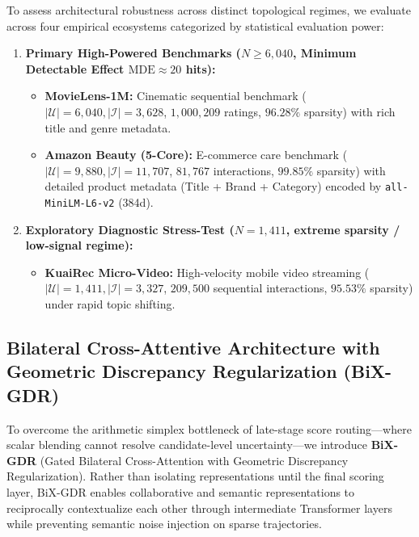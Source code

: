 To assess architectural robustness across distinct topological regimes, we evaluate across four empirical ecosystems categorized by statistical evaluation power:
\begin{enumerate}[leftmargin=*]
    \item \textbf{Primary High-Powered Benchmarks ($N \ge 6{,}040$, Minimum Detectable Effect $\text{MDE} \approx 20$ hits):}
    \begin{itemize}
        \item \textbf{MovieLens-1M:} Cinematic sequential benchmark ($|\mathcal{U}| = 6{,}040, |\mathcal{I}| = 3{,}628$, $1{,}000{,}209$ ratings, $96.28\%$ sparsity) with rich title and genre metadata.
        \item \textbf{Amazon Beauty (5-Core):} E-commerce care benchmark ($|\mathcal{U}| = 9{,}880, |\mathcal{I}| = 11{,}707$, $81{,}767$ interactions, $99.85\%$ sparsity) with detailed product metadata (Title + Brand + Category) encoded by \texttt{all-MiniLM-L6-v2} (384d).
    \end{itemize}
    \item \textbf{Exploratory Diagnostic Stress-Test ($N = 1{,}411$, extreme sparsity / low-signal regime):}
    \begin{itemize}
        \item \textbf{KuaiRec Micro-Video:} High-velocity mobile video streaming ($|\mathcal{U}| = 1{,}411, |\mathcal{I}| = 3{,}327$, $209{,}500$ sequential interactions, $95.53\%$ sparsity) under rapid topic shifting.
    \end{itemize}
\end{enumerate}

\subsection{Bilateral Cross-Attentive Architecture with Geometric Discrepancy Regularization (BiX-GDR)}
\label{sec:bix_gdr}

To overcome the arithmetic simplex bottleneck of late-stage score routing—where scalar blending cannot resolve candidate-level uncertainty—we introduce \textbf{BiX-GDR} (Gated Bilateral Cross-Attention with Geometric Discrepancy Regularization). Rather than isolating representations until the final scoring layer, BiX-GDR enables collaborative and semantic representations to reciprocally contextualize each other through intermediate Transformer layers while preventing semantic noise injection on sparse trajectories.

